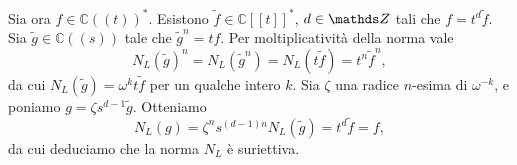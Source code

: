 \documentclass[a4paper]{article}
\newcommand*{\CC}{\mathds{C}}
\newcommand*{\RR}{\mathds{R}}
\begin{document}
Sia ora $f\in\CC((t))^*$. Esistono $\tilde{f}\in\CC[[t]]^*$, $d\in\ZZ$ tali che $f=t^d\tilde{f}$. Sia $\tilde{g}\in\CC((s))$ tale che $\tilde{g}^n=tf$. Per moltiplicatività della norma vale
$$
N_L(\tilde{g})^n=N_L(\tilde{g}^n)=N_L(t\tilde{f})=t^n\tilde{f}^n,
$$
da cui $N_L(\tilde{g})=\omega^kt\tilde{f}$ per un qualche intero $k$. Sia $\zeta$ una radice $n$-esima di $\omega^{-k}$, e poniamo $g=\zeta s^{d-1}\tilde{g}$. Otteniamo
$$
N_L(g)=\zeta^ns^{(d-1)n}N_L(\tilde{g})=t^d\tilde{f}=f,
$$
da cui deduciamo che la norma $N_L$ è suriettiva.

\begin{comment}
\begin{definition}
Sia $A$ un gruppo abeliano. Si dice norma su $A$ una funzione $\map{\norm{\cdot}}{A}{\RR}$ con le seguenti proprietà:
\begin{itemize}
\item $\norm{x}\ge0$ per ogni $x\in A$;
\item $\norm{x}=0$ se e solo se $x=0$;
\item $\norm{x+y}\le\norm{x}+\norm{y}$ per ogni $x,y\in A$.
\end{itemize}
\end{definition}
Ogni norma su $A$ induce una distanza su $A$ stesso, definita come $d(x,y)=\norm{x-y}$.
\begin{proposition}\thlabel{linear-map-normed-groups}
Siano $A,B$ gruppi abeliani normati, e sia $\map{f}{A}{B}$ un omomorfismo per cui esiste una costante $c\ge0$ tale che $\norm{f(x)}\le c\norm{x}$ per ogni $x\in A$. Allora $f$ è continua.
\end{proposition}
\begin{proof}
È evidente che $f$ è lipschitziana: dati $x,y\in A$ vale
$$
\norm{f(x)-f(y)}=\norm{f(x-y)}\le c\norm{x-y}.
$$
\end{proof}
\begin{proposition}\thlabel{bilinear-map-normed-groups}
Siano $A,B,C$ gruppi abeliani normati, e sia $\map{f}{A\times B}{C}$ una mappa $\ZZ$-bilineare per cui esiste una costante $c\ge 0$ tale che
$$
\norm{f(x,y)}\le c\norm{f(x)}\norm{f(y)}
$$
per ogni $x\in A,y\in B$. Allora $f$ è continua.
\end{proposition}
\begin{proof}
Consideriamo su $A\times B$ la distanza prodotto
$$
d((x_1,y_1),(x_2,y_2))=\norm{x_1-x_2}+\norm{y_1-y_2}
$$
che induce la topologia prodotto. Mostriamo che $f$ è lipschitziana sugli insiemi $K_a=\{(x,y)\in A\times B:\norm{x}\le a,\norm{y}\le a\}$ (da cui segue che $f$ è continua ovunque). Siano $(x_1,y_1),(x_2,y_2)\in K_a$. Allora

\end{comment}
\end{document}
